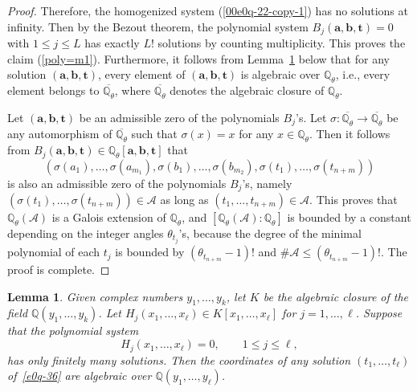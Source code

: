 \documentclass[10pt,a4paper]{amsart}
\numberwithin{equation}{section}
\newtheorem{Lemma}[Theorem]{Lemma}
\def\Q{\mathbb Q}
\begin{document}
\begin{proof}
Therefore, the homogenized system (\ref{00e0q-22-copy-1}) has no
solutions at infinity. Then by the Bezout theorem, the polynomial
system $B_j(\boldsymbol a,\boldsymbol b,\boldsymbol t)=0$ with $1\leq
j\leq L$ has exactly $L!$
solutions by counting multiplicity. This proves the claim (\ref{poly=m1}). Furthermore, it follows from Lemma~\ref{00lemma-2-10} below that for any solution $(\boldsymbol a, \boldsymbol b, \boldsymbol t)$, every element of $(\boldsymbol a, \boldsymbol b, \boldsymbol t)$ is algebraic over $\Q_{\theta}$, i.e., every element belongs to $\overline{\Q_{\theta}}$, where
$\overline{\Q_{\theta}}$ denotes the algebraic closure of $\Q_{\theta}$.

Let $(\boldsymbol a, \boldsymbol b, \boldsymbol t)$ be an admissible
zero of the polynomials $B_j$'s.
Let $\sigma\colon \overline{\Q_{\theta}}\to \overline{\Q_{\theta}}$ be any automorphism of $\overline{\Q_{\theta}}$ such that $\sigma(x)=x$ for any $x\in \Q_{\theta}$. Then it follows from $B_j(\boldsymbol a,\boldsymbol b,\boldsymbol t)\in\mathbb{Q}_{\theta}[\boldsymbol a,\boldsymbol b,\boldsymbol t] $ that
\[
 (\sigma(a_1),\dots,\sigma(a_{m_1}),\sigma(b_1),\dots,
 \sigma(b_{m_2}),\sigma(t_1),\dots,\sigma(t_{n+m}))
\]
is also an admissible zero of the polynomials $B_j$'s, namely $(
\sigma(t_1),\dots,\sigma(t_{n+m}))\in \mathcal{A}$ as long as $(t_1,\dots, t_{n+m})\in \mathcal{A}$.
This proves that $\Q_{\theta}(\mathcal{A})$ is a Galois extension of $\Q_{\theta}$, and $[\Q_{\theta}(\mathcal{A}):\Q_{\theta}]$ is bounded by a constant depending on the integer angles $\theta_{t_{j}}$'s, because the degree of the minimal polynomial of each $t_j$ is bounded by $(\theta_{t_{n+m}}-1)!$ and $\# \mathcal{A}\leq (\theta_{t_{n+m}}-1)!$. The proof is complete.
\end{proof}

\begin{Lemma}\label{00lemma-2-10} Given complex numbers
 $y_1,\dots,y_k$, let $K$
 be the algebraic closure of the field $\Q(y_1,\dots,y_k)$.
Let $H_j(x_1,\dots,x_\ell)\in K[x_1,\dots,x_\ell]$ for
$j=1,\dots,\ell$. Suppose that the polynomial system
\begin{equation}\label{e0q-36}
 H_j(x_1,\dots,x_\ell)=0,\qquad 1\leq j\leq \ell,
\end{equation}
has only finitely many solutions. Then the coordinates of any solution
$(t_1,\dots,t_\ell)$ of~\eqref{e0q-36} are algebraic over
$\Q(y_1,\dots,y_\ell)$.
\end{Lemma}
\end{document}
